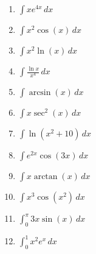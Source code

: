 \documentclass[12pt]{article}
\newif\ifans
\begin{document}
\begin{enumerate}

\item $\int xe^{4x}\,dx$ 

\ifans{\fbox{$\frac{x}{4}e^{4x}-\frac{1}{16}e^{4x}+C$}} \fi

\item $\int x^2\cos{(x)}\,dx$ 

\ifans{\fbox{$x^2\sin{x}+2x\cos{x}-2\sin{x}+C$}} \fi

\item $\int x^2\ln{(x)}\,dx$ 

\ifans{\fbox{$\frac{1}{3}x^3\ln{x}-\frac{1}{9}x^3+C$}} \fi

\item $\int{\frac{\ln{x}}{x^4}} \,dx$

\ifans{\fbox{$-\frac{1}{3}x^{-3}\ln{x}-\frac{1}{9}x^{-3}+C$}} \fi

\item $\int \arcsin{(x)}\,dx$ 

\ifans{\fbox{$x\arcsin{x}+\sqrt{1-x^2}+C$}} \fi

\item $\int x\sec^2{(x)}\,dx$ 

\ifans{\fbox{$x\tan{x}+\ln{|\cos{x}|}+C$}} \fi

\item $\int \ln{(x^2+10)}\,dx$ 

\ifans{\fbox{$x\ln{(x^2+10)}-2x+2\sqrt{10}\arctan{\left(\frac{x}{\sqrt{10}}\right)}+C$}} \fi

\item $\int e^{2x}\cos{(3x)}\,dx$ 

\ifans{\fbox{$\frac{2}{13}e^{2x}\cos{(3x)}+\frac{3}{13}e^{2x}\sin{(3x)}+C$}} \fi

\item $\int x\arctan{(x)}\,dx$

\ifans{\fbox{$\frac{x^2}{2}\tan^{-1}x-\frac{x}{2}+\frac{1}{2}\tan^{-1}x+C$}} \fi

\item $\int x^3 \cos{(x^2)} \,dx$

\ifans{\fbox{$\frac{1}{2}\cos{(x^2)}+\frac{1}{2}x^2\sin{(x^2)}+C$}} \fi

\item $\int_{0}^{\pi}3x\sin{(x)}\,dx$ 

\ifans{\fbox{$3\pi$}} \fi

\item $\int_{0}^{1}x^2e^{x}\,dx$ 


\end{enumerate}
\end{document}
